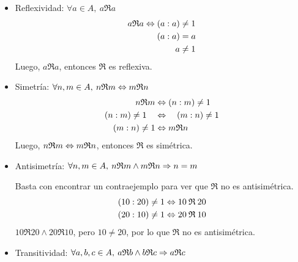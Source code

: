 \documentclass[a4paper,spanish]{article}
\begin{document}
  \begin{itemize}
    \item Reflexividad: $\forall a \in A,\> a\mathfrak{R}a$
    \begin{align*}
      a\mathfrak{R}a \Leftrightarrow (a:a) &\neq 1 \\
      (a:a) &= a \\
      a &\neq 1
    \end{align*}
    Luego, $a\mathfrak{R}a$, entonces $\mathfrak{R}$ es reflexiva.

    \item Simetría: $\forall n,m \in A,\> n\mathfrak{R}m \Leftrightarrow m\mathfrak{R}n$
    \begin{align*}
      n\mathfrak{R}m      &\Leftrightarrow (n:m) \neq 1\\
      (n:m) \neq 1 \quad  &\Leftrightarrow \quad (m:n) \neq 1 \\
      (m:n) \neq 1        &\Leftrightarrow m\mathfrak{R}n
    \end{align*}
    Luego, $n\mathfrak{R}m \Leftrightarrow m\mathfrak{R}n$,
    entonces $\mathfrak{R}$ es simétrica.

    \item Antisimetría: $\forall n,m \in A,\> 
    n\mathfrak{R}m \land m\mathfrak{R}n \Rightarrow n=m$

    Basta con encontrar un contraejemplo para ver que $\mathfrak{R}$ 
    no es antisimétrica.
    \begin{align*}
      (10:20) \neq 1 \Leftrightarrow 10\>\mathfrak{R}\>20 \\
      (20:10) \neq 1 \Leftrightarrow 20\>\mathfrak{R}\>10
    \end{align*}
    $10\mathfrak{R}20 \land 20\mathfrak{R}10$, pero $10 \neq 20$, por lo que
    $\mathfrak{R}$ no es antisimétrica.

    \item Transitividad: $\forall a,b,c \in A,\>
    a\mathfrak{R}b \land b\mathfrak{R}c \Rightarrow a\mathfrak{R}c$


\end{itemize}
\end{document}

